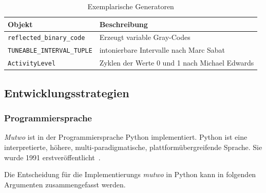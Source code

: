 \documentclass[12pt,a4paper,ngerman]{article}
\begin{document}
\begin{table}[h!]
    \begin{center}
        \begin{tabular}{l l} 
            \hline
            Objekt & Beschreibung \\ [0.5ex] 
            \hline\hline
            \texttt{reflected\_binary\_code} & Erzeugt variable Gray-Codes \\
            \texttt{TUNEABLE\_INTERVAL\_TUPLE} & intonierbare Intervalle nach Marc Sabat \\
            \texttt{ActivityLevel} & Zyklen der Werte 0 und 1 nach Michael Edwards \\ [1ex] 
            \hline
        \end{tabular}
    \end{center}

    \caption{Exemplarische Generatoren}
\end{table}


\subsection{Entwicklungsstrategien}

\subsubsection{Programmiersprache}
\label{programmingLanguage}

\emph{Mutwo} ist in der Programmiersprache Python implementiert.
Python ist eine interpretierte, höhere, multi-paradigmatische, plattformübergreifende Sprache.
Sie wurde 1991 erstveröffentlicht~\parencite{generalPythonFAQ}.

\smallskip

Die Entscheidung für die Implementierungs \emph{mutwo} in Python kann in folgenden Argumenten zusammengefasst werden.
\end{document}
